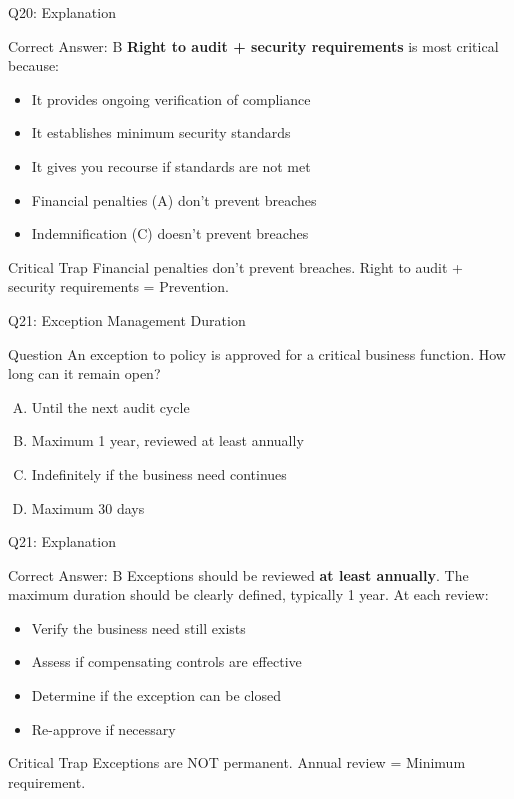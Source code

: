 \documentclass{beamer}
\begin{document}
	\begin{frame}{Q20: Explanation}
		\begin{block}{Correct Answer: B}
			\textbf{Right to audit + security requirements} is most critical because:
			\begin{itemize}
				\item It provides ongoing verification of compliance
				\item It establishes minimum security standards
				\item It gives you recourse if standards are not met
				\item Financial penalties (A) don't prevent breaches
				\item Indemnification (C) doesn't prevent breaches
			\end{itemize}
		\end{block}
		\begin{alertblock}{Critical Trap}
			Financial penalties don't prevent breaches.
			Right to audit + security requirements = Prevention.
		\end{alertblock}
	\end{frame}
	
	\begin{frame}{Q21: Exception Management Duration}
		\begin{block}{Question}
			An exception to policy is approved for a critical business function. How long can it remain open?
		\end{block}
		\begin{enumerate}[(A)]
			\item Until the next audit cycle
			\item Maximum 1 year, reviewed at least annually
			\item Indefinitely if the business need continues
			\item Maximum 30 days
		\end{enumerate}
	\end{frame}
	
	\begin{frame}{Q21: Explanation}
		\begin{block}{Correct Answer: B}
			Exceptions should be reviewed \textbf{at least annually}. The maximum duration should be clearly defined, typically 1 year. At each review:
			\begin{itemize}
				\item Verify the business need still exists
				\item Assess if compensating controls are effective
				\item Determine if the exception can be closed
				\item Re-approve if necessary
			\end{itemize}
		\end{block}
		\begin{alertblock}{Critical Trap}
			Exceptions are NOT permanent.
			Annual review = Minimum requirement.
		\end{alertblock}
	\end{frame}
	
\end{document}
